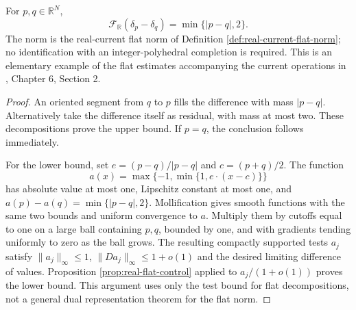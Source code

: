 \begin{proposition}\label{prop:two-point-real-flat}
For $p,q\in\mathbb R^N$,
\[
 \mathcal F_{\mathbb R}(\delta_p-\delta_q)=\min\{|p-q|,2\}.
\]
The norm is the real-current flat norm of Definition \ref{def:real-current-flat-norm}; no identification with an integer-polyhedral completion is required. This is an elementary example of the flat estimates accompanying the current operations in \cite{Sim18}, Chapter 6, Section 2.
\end{proposition}
\begin{proof}
An oriented segment from $q$ to $p$ fills the difference with mass $|p-q|$. Alternatively take the difference itself as residual, with mass at most two. These decompositions prove the upper bound. If $p=q$, the conclusion follows immediately.

For the lower bound, set $e=(p-q)/|p-q|$ and $c=(p+q)/2$. The function
\[
 a(x)=\max\{-1,\min\{1,e\cdot(x-c)\}\}
\]
has absolute value at most one, Lipschitz constant at most one, and $a(p)-a(q)=\min\{|p-q|,2\}$. Mollification gives smooth functions with the same two bounds and uniform convergence to $a$. Multiply them by cutoffs equal to one on a large ball containing $p,q$, bounded by one, and with gradients tending uniformly to zero as the ball grows. The resulting compactly supported tests $a_j$ satisfy $\|a_j\|_\infty\leq1$, $\|Da_j\|_\infty\leq1+o(1)$ and the desired limiting difference of values. Proposition \ref{prop:real-flat-control} applied to $a_j/(1+o(1))$ proves the lower bound. This argument uses only the test bound for flat decompositions, not a general dual representation theorem for the flat norm.
\end{proof}

